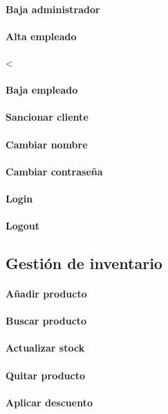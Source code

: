 \paragraph{Baja administrador}
\paragraph{Alta empleado}<
\paragraph{Baja empleado}
\paragraph{Sancionar cliente}
\paragraph{Cambiar nombre}
\paragraph{Cambiar contraseña}
\paragraph{Login}
\paragraph{Logout}
\subsection{Gestión de inventario}
\paragraph{Añadir producto}
\paragraph{Buscar producto}
\paragraph{Actualizar stock}
\paragraph{Quitar producto}
\paragraph{Aplicar descuento}
